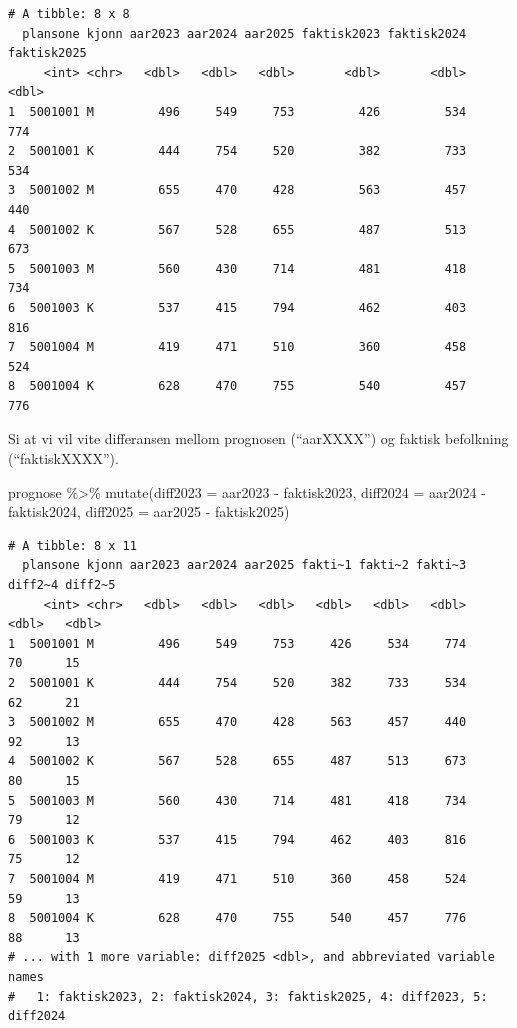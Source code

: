 \documentclass[
  letterpaper,
  DIV=11,
  numbers=noendperiod]{scrreprt}
\newenvironment{Shaded}{\begin{snugshade}}{\end{snugshade}}
\newcommand{\AttributeTok}[1]{\textcolor[rgb]{0.40,0.45,0.13}{#1}}
\newcommand{\FunctionTok}[1]{\textcolor[rgb]{0.28,0.35,0.67}{#1}}
\newcommand{\NormalTok}[1]{\textcolor[rgb]{0.00,0.23,0.31}{#1}}
\newcommand{\SpecialCharTok}[1]{\textcolor[rgb]{0.37,0.37,0.37}{#1}}
\begin{document}
\begin{verbatim}
# A tibble: 8 x 8
  plansone kjonn aar2023 aar2024 aar2025 faktisk2023 faktisk2024 faktisk2025
     <int> <chr>   <dbl>   <dbl>   <dbl>       <dbl>       <dbl>       <dbl>
1  5001001 M         496     549     753         426         534         774
2  5001001 K         444     754     520         382         733         534
3  5001002 M         655     470     428         563         457         440
4  5001002 K         567     528     655         487         513         673
5  5001003 M         560     430     714         481         418         734
6  5001003 K         537     415     794         462         403         816
7  5001004 M         419     471     510         360         458         524
8  5001004 K         628     470     755         540         457         776
\end{verbatim}

Si at vi vil vite differansen mellom prognosen (``aarXXXX'') og faktisk
befolkning (``faktiskXXXX'').

\begin{Shaded}
\begin{Highlighting}[]
\NormalTok{prognose }\SpecialCharTok{\%\textgreater{}\%} 
  \FunctionTok{mutate}\NormalTok{(}\AttributeTok{diff2023 =}\NormalTok{ aar2023 }\SpecialCharTok{{-}}\NormalTok{ faktisk2023,}
         \AttributeTok{diff2024 =}\NormalTok{ aar2024 }\SpecialCharTok{{-}}\NormalTok{ faktisk2024,}
         \AttributeTok{diff2025 =}\NormalTok{ aar2025 }\SpecialCharTok{{-}}\NormalTok{ faktisk2025)}
\end{Highlighting}
\end{Shaded}

\begin{verbatim}
# A tibble: 8 x 11
  plansone kjonn aar2023 aar2024 aar2025 fakti~1 fakti~2 fakti~3 diff2~4 diff2~5
     <int> <chr>   <dbl>   <dbl>   <dbl>   <dbl>   <dbl>   <dbl>   <dbl>   <dbl>
1  5001001 M         496     549     753     426     534     774      70      15
2  5001001 K         444     754     520     382     733     534      62      21
3  5001002 M         655     470     428     563     457     440      92      13
4  5001002 K         567     528     655     487     513     673      80      15
5  5001003 M         560     430     714     481     418     734      79      12
6  5001003 K         537     415     794     462     403     816      75      12
7  5001004 M         419     471     510     360     458     524      59      13
8  5001004 K         628     470     755     540     457     776      88      13
# ... with 1 more variable: diff2025 <dbl>, and abbreviated variable names
#   1: faktisk2023, 2: faktisk2024, 3: faktisk2025, 4: diff2023, 5: diff2024
\end{verbatim}
\end{document}
